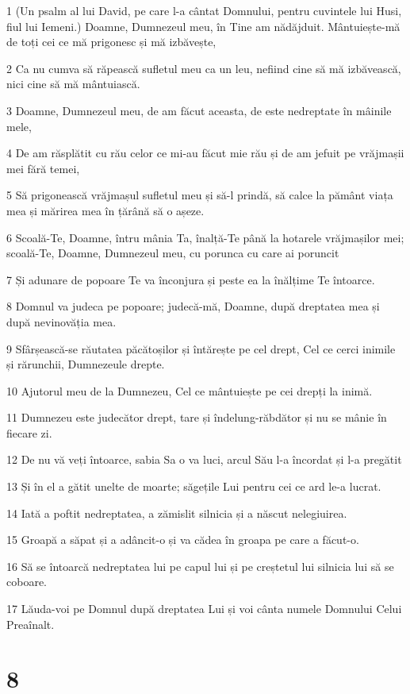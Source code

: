 \par 1 (Un psalm al lui David, pe care l-a cântat Domnului, pentru cuvintele lui Husi, fiul lui Iemeni.) Doamne, Dumnezeul meu, în Tine am nădăjduit. Mântuiește-mă de toți cei ce mă prigonesc și mă izbăvește,
\par 2 Ca nu cumva să răpească sufletul meu ca un leu, nefiind cine să mă izbăvească, nici cine să mă mântuiască.
\par 3 Doamne, Dumnezeul meu, de am făcut aceasta, de este nedreptate în mâinile mele,
\par 4 De am răsplătit cu rău celor ce mi-au făcut mie rău și de am jefuit pe vrăjmașii mei fără temei,
\par 5 Să prigonească vrăjmașul sufletul meu și să-l prindă, să calce la pământ viața mea și mărirea mea în țărână să o așeze.
\par 6 Scoală-Te, Doamne, întru mânia Ta, înalță-Te până la hotarele vrăjmașilor mei; scoală-Te, Doamne, Dumnezeul meu, cu porunca cu care ai poruncit
\par 7 Și adunare de popoare Te va înconjura și peste ea la înălțime Te întoarce.
\par 8 Domnul va judeca pe popoare; judecă-mă, Doamne, după dreptatea mea și după nevinovăția mea.
\par 9 Sfârșească-se răutatea păcătoșilor și întărește pe cel drept, Cel ce cerci inimile și rărunchii, Dumnezeule drepte.
\par 10 Ajutorul meu de la Dumnezeu, Cel ce mântuiește pe cei drepți la inimă.
\par 11 Dumnezeu este judecător drept, tare și îndelung-răbdător și nu se mânie în fiecare zi.
\par 12 De nu vă veți întoarce, sabia Sa o va luci, arcul Său l-a încordat și l-a pregătit
\par 13 Și în el a gătit unelte de moarte; săgețile Lui pentru cei ce ard le-a lucrat.
\par 14 Iată a poftit nedreptatea, a zămislit silnicia și a născut nelegiuirea.
\par 15 Groapă a săpat și a adâncit-o și va cădea în groapa pe care a făcut-o.
\par 16 Să se întoarcă nedreptatea lui pe capul lui și pe creștetul lui silnicia lui să se coboare.
\par 17 Lăuda-voi pe Domnul după dreptatea Lui și voi cânta numele Domnului Celui Preaînalt.

\chapter{8}

